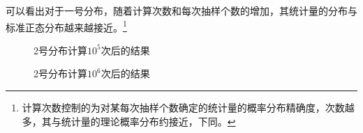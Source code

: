 \documentclass[a4paper,11pt]{article}
\begin{document}
\newpage 可以看出对于一号分布，随着计算次数和每次抽样个数的增加，其统计量的分布与标准正态分布越来越接近。\footnote{计算次数控制的为对某每次抽样个数确定的统计量的概率分布精确度，次数越多，其与统计量的理论概率分布约接近，下同。}

\begin{figure}[!htbp]   
\centering     
{}
\caption{2号分布计算$10^{5}$次后的结果}      
\end{figure}


\begin{figure}[!htbp]   
\centering     
{}
\caption{2号分布计算$10^{6}$次后的结果}      
\end{figure}
\end{document}
